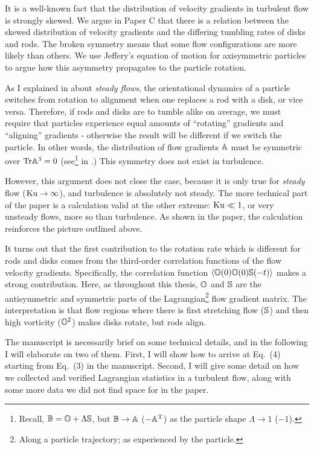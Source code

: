 \documentclass[thesis.tex]{subfiles}
\begin{document}
It is a well-known fact that the distribution of velocity gradients in turbulent flow is strongly skewed\cite{pumirskewed,luthi2009}. We argue in Paper C that there is a relation between the skewed distribution of velocity gradients and the differing tumbling rates of disks and rods. The broken symmetry means that some flow configurations are more likely than others. We use Jeffery's equation of motion for axisymmetric particles to argue how this asymmetry propagates to the particle rotation. 

As I explained in  about \emph{steady flows}, the orientational dynamics of a particle switches from rotation to alignment when one replaces a rod with a disk, or vice versa. Therefore, if rods and disks are to tumble alike on average, we must require that particles experience equal amounts of ``rotating'' gradients and ``aligning'' gradients - otherwise the result will be different if we switch the particle.
In other words, the distribution of flow gradients $\mathbb{A}$ must be symmetric over $\mbox{Tr} \mathbb{A}^3=0$ (see\footnote{Recall, $\mathbb{B}=\mathbb{O} + \Lambda\mathbb{S}$, but $\mathbb{B} \to \mathbb{A}$ ($-\mathbb{A}^{\mathrm T}$) as the particle shape $\Lambda\to 1$ ($-1$).}  in .) This symmetry does not exist in turbulence.

However, this argument does not close the case, because it is only true for \emph{steady} flow ($\mbox{Ku}\to\infty$), and turbulence is absolutely not steady. The more technical part of the paper is a calculation valid at the other extreme: $\mbox{Ku} \ll 1$, or very unsteady flows, more so than turbulence. As shown in the paper, the calculation reinforces the picture outlined above.

It turns out that the first contribution to the rotation rate which is different for rods and disks comes from the third-order correlation functions of the flow velocity gradients. Specifically, the correlation function $\langle \mathbb{O}(0) \mathbb{O}(0) \mathbb{S}(-t)\rangle$ makes a strong contribution. Here, as throughout this thesis, $\mathbb{O}$ and $\mathbb{S}$ are the antisymmetric and symmetric parts of the Lagrangian\footnote{Along a particle trajectory; as experienced by the particle.} flow gradient matrix. The interpretation is that flow regions where there is first stretching flow ($\mathbb{S}$) and then high vorticity ($\mathbb{O}^2$) makes disks rotate, but rods align.

The manuscript is necessarily brief on some technical details, and in the following I will elaborate on two of them. First, I will show how to arrive at Eq.~(4) starting from Eq.~(3) in the manuscript. Second, I will give some detail on how we collected and verified Lagrangian statistics in a turbulent flow, along with some more data we did not find space for in the paper.
\end{document}
